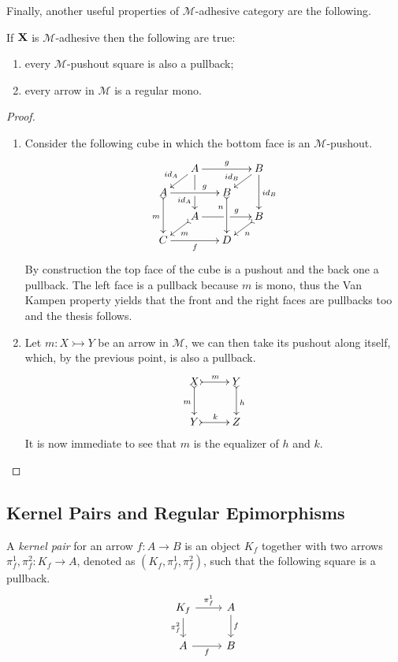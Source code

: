 \documentclass[runningheads,envcountsect]{lipics-v2021}
\def\C{\textbf {\textup{C}}}
\def\X{\textbf {\textup{X}}}
\newcommand{\mto}{\rightarrowtail}
\newcommand{\id}[1]{\mathsf{id}_{#1}}
\begin{document}
Finally, another  useful properties of $\mathcal{M}$-adhesive category are the following.
\begin{proposition}\label{prop:regmono}
	If $\X$ is $\mathcal{M}$-adhesive then the following are true:
	\begin{enumerate}
		\item every $\mathcal{M}$-pushout square is also a pullback;
		\item every arrow in $\mathcal{M}$ is a regular mono.
	\end{enumerate}
\end{proposition}
\begin{proof}
	\begin{enumerate}
		\item  Consider the following cube in which the bottom face is an $\mathcal{M}$-pushout.
		\[\xymatrix@C=15pt@R=9pt{&A\ar[dd]|\hole_(.65){\id{A}}\ar[rr]^{g} \ar[dl]_{\id{A}} && B \ar[dd]^{\id{B}} \ar[dl]_(.6){\id{B}} \\ A  \ar@{>->}[dd]_{m}\ar[rr]^(.65){g} & & B \ar@{>->}[dd]_(.3){n}\\&A\ar[rr]|\hole^(.65){g} \ar@{>->}[dl]^{m} && B \ar@{>->}[dl]^{n} \\C \ar[rr]_{f} & & D}\]
		By construction the top face of the cube is a pushout and the back one a pullback. The left face is a pullback because $m$ is mono, thus the Van Kampen property yields that the front and the right faces are pullbacks too and the thesis follows.
		\item Let $m\colon X\mto Y$ be an arrow in $\mathcal{M}$, we can then take its pushout along itself, which, by the previous point, is also a pullback.
		\[\xymatrix{X \ar@{>->}[r]^{m} \ar@{>->}[d]_{m}& Y \ar@{>->}[d]^{h}\\ Y \ar@{>->}[r]^{k} & Z}\]
		It is now immediate to see that $m$ is the equalizer of $h$ and $k$.  
	\end{enumerate}
\end{proof}

\subsection{Kernel Pairs and Regular Epimorphisms}

\begin{definition}
    A \emph{kernel pair} for an arrow $f: A \to B$ is an object $K_f$ together with two arrows $\pi^1_f, \pi^2_f : K_f \to A$, denoted as $(K_f, \pi^1_f, \pi^2_f)$, such that the following square is a pullback.
    \[
        \begin{tikzcd}
            K_f \ar[r, "{\pi^1_f}"] \ar[d, "{\pi^2_f}" swap] & A \arrow[d, "f"] \\
            A \ar[r, "f"swap] & B
        \end{tikzcd}
    \]
\end{definition}
\end{document}
